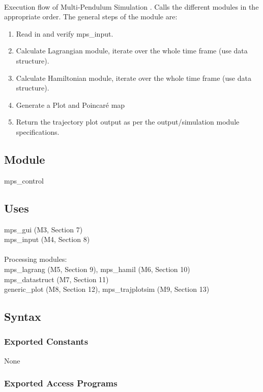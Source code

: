 \documentclass[12pt, titlepage]{article}
\newcommand{\progname}{Multi-Pendulum Simulation }
\begin{document}
\\

\noindent Execution flow of \progname{}. Calls the different modules in the appropriate order.
The general steps of the module are:
\begin{enumerate}
	\item Read in and verify mps\_input.
	\item Calculate Lagrangian module, iterate over the whole time frame (use data structure).
	\item Calculate Hamiltonian module, iterate over the whole time frame (use data structure).
	\item Generate a Plot and Poincar\'{e} map
	\item Return the trajectory plot output as per the output/simulation module specifications.
\end{enumerate}

\subsection{Module}

mps\_control

\subsection{Uses}

mps\_gui (M3, Section 7)\\
mps\_input (M4, Section 8)\\\\
Processing modules:\\
mps\_lagrang (M5, Section 9), mps\_hamil (M6, Section 10)\\
mps\_datastruct (M7, Section 11)\\
generic\_plot (M8, Section 12), mps\_trajplotsim (M9, Section 13) 

\subsection{Syntax}

\subsubsection{Exported Constants}

None

\subsubsection{Exported Access Programs}
\end{document}
